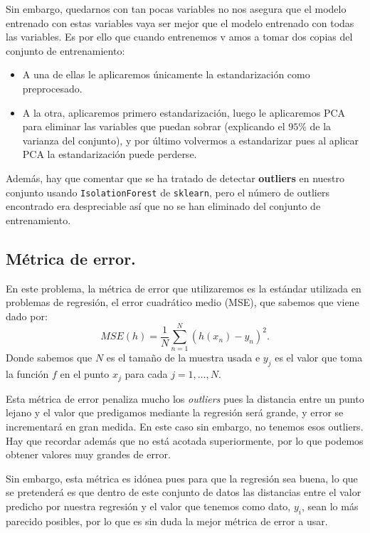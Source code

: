 \documentclass[a4paper, 20pt]{article}
\begin{document}
Sin embargo, quedarnos con tan pocas variables no nos asegura que el modelo entrenado con estas variables vaya ser mejor que el modelo entrenado con todas las variables.  Es por ello que cuando entrenemos v amos a tomar dos copias del conjunto de entrenamiento:
\begin{itemize}
\item A una de ellas le aplicaremos únicamente la estandarización como preprocesado.
  \item A la otra, aplicaremos primero estandarización, luego le aplicaremos PCA para eliminar las variables que puedan sobrar (explicando el $95\%$ de la varianza del conjunto), y por último volvermos a estandarizar pues al aplicar PCA la estandarización puede perderse.
 \end{itemize}

Además, hay que comentar que se ha tratado de detectar \textbf{outliers} en nuestro conjunto usando \lstinline{IsolationForest} de \lstinline{sklearn}, pero el número de outliers encontrado era despreciable así que no se han eliminado del conjunto de entrenamiento.



\subsection{Métrica de error.}

En este problema, la métrica de error que utilizaremos es la estándar utilizada en problemas de regresión, el error cuadrático medio (MSE), que sabemos que viene dado por:
\[
MSE(h) = \frac{1}{N} \sum_{n = 1}^N (h(x_n) - y_n)^2.
\]
Donde sabemos que $N$ es el tamaño de la muestra usada e $y_j$ es el valor que toma la función $f$ en el punto $x_j$ para cada $j = 1,\dots ,N$. 

Esta métrica de error penaliza mucho los \emph{outliers} pues la distancia entre un punto lejano y el valor que predigamos mediante la regresión será grande, y error se incrementará en gran medida. En este caso sin embargo, no tenemos esos outliers. Hay que recordar además que no está acotada superiormente, por lo que podemos obtener valores muy grandes de error.

Sin embargo, esta métrica es idónea pues para que la regresión sea buena, lo que se pretenderá es que dentro de este conjunto de datos las distancias entre el valor predicho por nuestra regresión y el valor que tenemos como dato, $y_i$, sean lo más parecido posibles, por lo que es sin duda la mejor métrica de error a usar.
\end{document}
